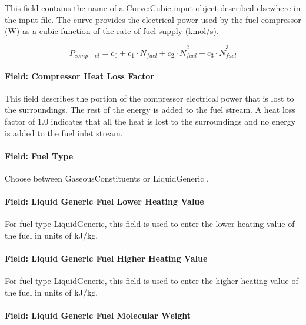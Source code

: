 This field contains the name of a Curve:Cubic input object described elsewhere in the input file. The curve provides the electrical power used by the fuel compressor (W) as a cubic function of the rate of fuel supply (kmol/s).

\begin{equation}
{P_{comp - el}} = {c_0} + {c_1} \cdot {\dot N_{fuel}} + {c_2} \cdot \dot N_{fuel}^2 + {c_3} \cdot \dot N_{fuel}^3
\end{equation}

\paragraph{Field: Compressor Heat Loss Factor}\label{field-compressor-heat-loss-factor}

This field describes the portion of the compressor electrical power that is lost to the surroundings. The rest of the energy is added to the fuel stream. A heat loss factor of 1.0 indicates that all the heat is lost to the surroundings and no energy is added to the fuel inlet stream.

\paragraph{Field: Fuel Type}\label{field-fuel-type-3}

Choose between GaseousConstituents or LiquidGeneric .

\paragraph{Field: Liquid Generic Fuel Lower Heating Value}\label{field-liquid-generic-fuel-lower-heating-value}

For fuel type LiquidGeneric, this field is used to enter the lower heating value of the fuel in units of kJ/kg.

\paragraph{Field: Liquid Generic Fuel Higher Heating Value}\label{field-liquid-generic-fuel-higher-heating-value}

For fuel type LiquidGeneric, this field is used to enter the higher heating value of the fuel in units of kJ/kg.

\paragraph{Field: Liquid Generic Fuel Molecular Weight}\label{field-liquid-generic-fuel-molecular-weight}

